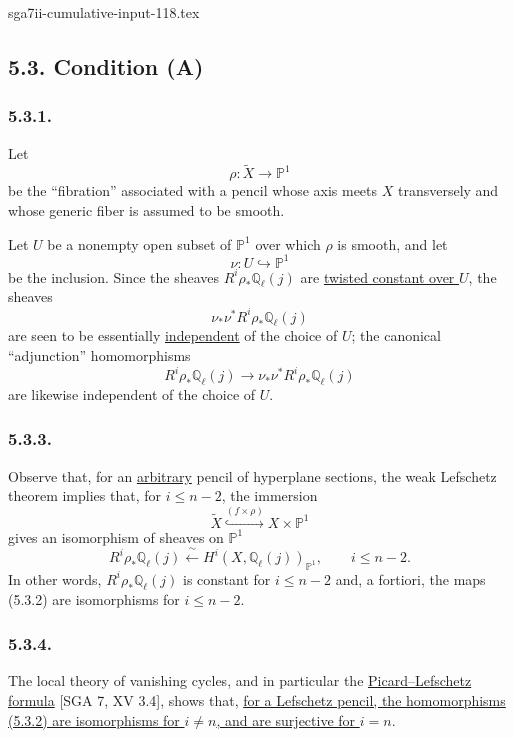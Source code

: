 \begin{filecontents*}{sga7ii-cumulative-input-118.tex}
\subsection*{5.3. Condition (A)}

\subsubsection*{5.3.1.}
Let
\[
\rho:\widetilde X\longrightarrow\mathbb P^1
\]
be the ``fibration'' associated with a pencil whose axis meets $X$
transversely and whose generic fiber is assumed to be smooth.

Let $U$ be a nonempty open subset of $\mathbb P^1$ over which $\rho$ is
smooth, and let
\begin{equation}\tag{5.3.1.1}
\nu:U\hookrightarrow\mathbb P^1
\end{equation}
be the inclusion.  Since the sheaves
$R^i\rho_*\mathbb Q_\ell(j)$ are \underline{twisted constant over $U$}, the
sheaves
\[
\nu_*\nu^*R^i\rho_*\mathbb Q_\ell(j)
\]
are seen to be essentially \underline{independent} of the choice of $U$;
the canonical ``adjunction'' homomorphisms
\begin{equation}\tag{5.3.2}
R^i\rho_*\mathbb Q_\ell(j)
\longrightarrow
\nu_*\nu^*R^i\rho_*\mathbb Q_\ell(j)
\end{equation}
are likewise independent of the choice of $U$.

\subsubsection*{5.3.3.}
Observe that, for an \underline{arbitrary} pencil of hyperplane sections,
the weak Lefschetz theorem implies that, for $i\leq n-2$, the immersion
\[
\widetilde X\overset{(f\times\rho)}{\hookrightarrow}
X\times\mathbb P^1
\]
gives an isomorphism of sheaves on $\mathbb P^1$
\[
R^i\rho_*\mathbb Q_\ell(j)
\xleftarrow{\ \sim\ }
H^i(X,\mathbb Q_\ell(j))_{\mathbb P^1},
\qquad i\leq n-2.
\]
In other words, $R^i\rho_*\mathbb Q_\ell(j)$ is constant for
$i\leq n-2$ and, a fortiori, the maps (5.3.2) are isomorphisms for
$i\leq n-2$.

\subsubsection*{5.3.4.}
The local theory of vanishing cycles, and in particular the
\underline{Picard--Lefschetz formula} [SGA 7, XV 3.4], shows that,
\underline{for a Lefschetz pencil, the homomorphisms (5.3.2) are
isomorphisms for $i\neq n$, and are surjective for $i=n$}.


\end{filecontents*}
